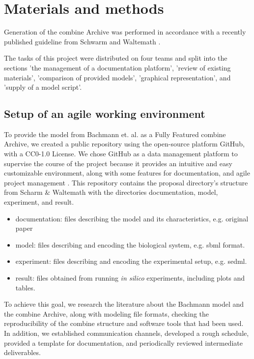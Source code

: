 \section*{Materials and methods} \label{sec:matmet}

Generation of the \ac{combine} Archive was performed in accordance with a recently published guideline from Schwarm and Waltemath \cite{combine}.

The tasks of this project were distributed on  four teams and split into the sections 'the management of a documentation platform', 'review of existing materials', 'comparison of provided models', 'graphical representation', and 'supply of a model script'.

\subsection*{Setup of an agile working environment} \label{setupagwork}
To provide the model from Bachmann et. al. \cite{bachmannmodel} as a Fully Featured \ac{combine} Archive, we created a public repository using the open-source platform GitHub, with a CC0-1.0 License. We chose GitHub as a data management platform to supervise the course of the project because it provides an intuitive and easy customizable environment, along with some features for documentation, and agile project management \cite{github}. This repository contains the proposal directory's structure from Scharm \& Waltemath \cite{combine} with the directories documentation, model, experiment, and result.
\begin{itemize}
    \item documentation: files describing the model and its characteristics, e.g. original paper
    \item model: files describing and encoding the biological system, e.g. \ac{sbml} format.
    \item experiment: files describing and encoding the experimental setup, e.g. \ac{sedml}.
    \item result: files obtained from running \textit{in silico} experiments, including plots and tables.
\end{itemize}

To achieve this goal, we research the literature about the Bachmann model and the \ac{combine} Archive, along with modeling file formats, checking the reproducibility of the \ac{combine} structure and software tools that had been used. In addition, we established communication channels, developed a rough schedule, provided a template for documentation, and periodically reviewed intermediate deliverables.

